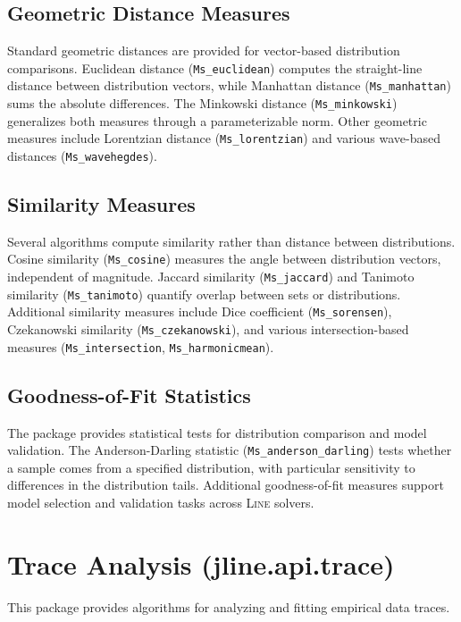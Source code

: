\subsection{Geometric Distance Measures}

Standard geometric distances are provided for vector-based distribution comparisons. Euclidean distance (\texttt{Ms\_euclidean}) computes the straight-line distance between distribution vectors, while Manhattan distance (\texttt{Ms\_manhattan}) sums the absolute differences. The Minkowski distance (\texttt{Ms\_minkowski}) generalizes both measures through a parameterizable norm. Other geometric measures include Lorentzian distance (\texttt{Ms\_lorentzian}) and various wave-based distances (\texttt{Ms\_wavehegdes}).

\subsection{Similarity Measures}

Several algorithms compute similarity rather than distance between distributions. Cosine similarity (\texttt{Ms\_cosine}) measures the angle between distribution vectors, independent of magnitude. Jaccard similarity (\texttt{Ms\_jaccard}) and Tanimoto similarity (\texttt{Ms\_tanimoto}) quantify overlap between sets or distributions. Additional similarity measures include Dice coefficient (\texttt{Ms\_sorensen}), Czekanowski similarity (\texttt{Ms\_czekanowski}), and various intersection-based measures (\texttt{Ms\_intersection}, \texttt{Ms\_harmonicmean}).

\subsection{Goodness-of-Fit Statistics}

The package provides statistical tests for distribution comparison and model validation. The Anderson-Darling statistic (\texttt{Ms\_anderson\_darling}) tests whether a sample comes from a specified distribution, with particular sensitivity to differences in the distribution tails. Additional goodness-of-fit measures support model selection and validation tasks across \textsc{Line} solvers.

\section{Trace Analysis (jline.api.trace)}

This package provides algorithms for analyzing and fitting empirical data traces.

